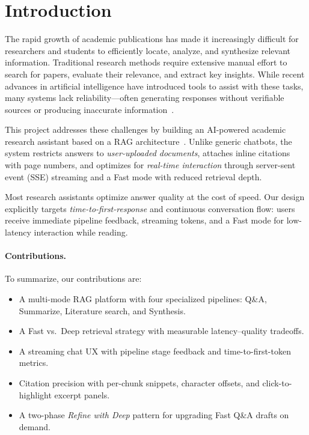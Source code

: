 \documentclass[sigplan,review,anonymous]{acmart}
\begin{document}
\maketitle

\section{Introduction}
\label{sec:intro}

The rapid growth of academic publications has made it increasingly difficult for researchers
and students to efficiently locate, analyze, and synthesize relevant information.
Traditional research methods require extensive manual effort to search for papers, evaluate
their relevance, and extract key insights.
While recent advances in artificial intelligence have introduced tools to assist with these
tasks, many systems lack reliability---often generating responses without verifiable sources
or producing inaccurate information~\cite{ase2026proposal}.

This project addresses these challenges by building an AI-powered academic research assistant
based on a RAG architecture~\cite{lewis2020rag}.
Unlike generic chatbots, the system restricts answers to \emph{user-uploaded documents},
attaches inline citations with page numbers, and optimizes for \emph{real-time interaction}
through server-sent event (SSE) streaming and a Fast mode with reduced retrieval depth.

Most research assistants optimize answer quality at the cost of speed.
Our design explicitly targets \emph{time-to-first-response} and continuous conversation flow:
users receive immediate pipeline feedback, streaming tokens, and a Fast mode for low-latency
interaction while reading.

\paragraph{Contributions.}
To summarize, our contributions are:
\begin{itemize}
  \item A multi-mode RAG platform with four specialized pipelines: Q\&A, Summarize,
        Literature search, and Synthesis.
  \item A Fast vs.\ Deep retrieval strategy with measurable latency--quality tradeoffs.
  \item A streaming chat UX with pipeline stage feedback and time-to-first-token metrics.
  \item Citation precision with per-chunk snippets, character offsets, and click-to-highlight
        excerpt panels.
  \item A two-phase \emph{Refine with Deep} pattern for upgrading Fast Q\&A drafts on demand.
\end{itemize}
\end{document}
